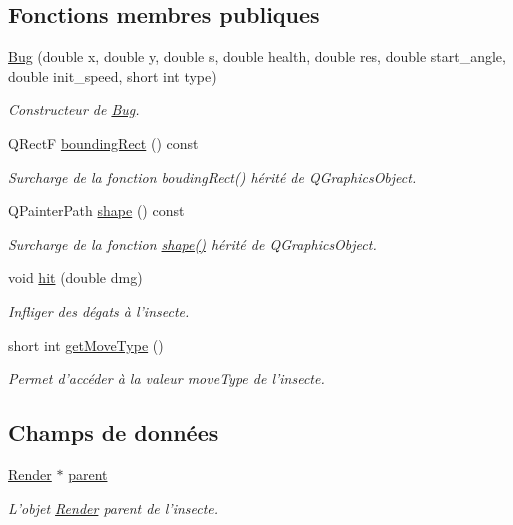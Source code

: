 \subsection*{Fonctions membres publiques}
\begin{DoxyCompactItemize}
\item 
\hyperlink{classBug_a1d3140d50abd44257d5e0b1b6dcb4514}{Bug} (double x, double y, double s, double health, double res, double start\_\-angle, double init\_\-speed, short int type)
\begin{DoxyCompactList}\small\item\em Constructeur de \hyperlink{classBug}{Bug}. \end{DoxyCompactList}\item 
QRectF \hyperlink{classBug_a9b39c25361faad07b1bf2dd927d09dab}{boundingRect} () const 
\begin{DoxyCompactList}\small\item\em Surcharge de la fonction boudingRect() hérité de QGraphicsObject. \end{DoxyCompactList}\item 
QPainterPath \hyperlink{classBug_a587a36d3145c2b4dba6c689af22c65ac}{shape} () const 
\begin{DoxyCompactList}\small\item\em Surcharge de la fonction \hyperlink{classBug_a587a36d3145c2b4dba6c689af22c65ac}{shape()} hérité de QGraphicsObject. \end{DoxyCompactList}\item 
void \hyperlink{classBug_a63402c05b5ba3fb034e41f1ced0e4b9f}{hit} (double dmg)
\begin{DoxyCompactList}\small\item\em Infliger des dégats à l'insecte. \end{DoxyCompactList}\item 
short int \hyperlink{classBug_aced471cedcfa855baddf4c827003e755}{getMoveType} ()
\begin{DoxyCompactList}\small\item\em Permet d'accéder à la valeur moveType de l'insecte. \end{DoxyCompactList}\end{DoxyCompactItemize}
\subsection*{Champs de données}
\begin{DoxyCompactItemize}
\item 
\hyperlink{classRender}{Render} $\ast$ \hyperlink{classBug_a7a93aae4e4b7a215c94ff85d0bd6e26d}{parent}
\begin{DoxyCompactList}\small\item\em L'objet \hyperlink{classRender}{Render} parent de l'insecte. \end{DoxyCompactList}\end{DoxyCompactItemize}
